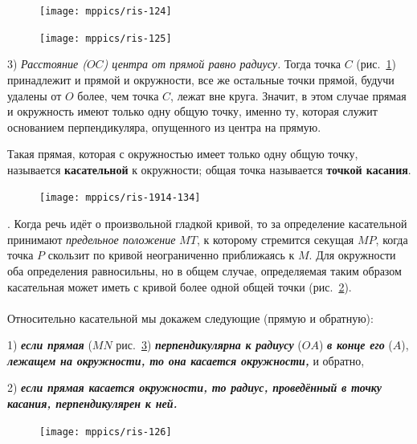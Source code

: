 \documentclass[twoside]{book}
\makeatletter
\newcommand{\rindex}[2][\imki@jobname]{%
  \index[#1]{\detokenize{#2}}%
}
\makeatother
\begin{document}
\begin{figure}
\centering
\texttt{[image: mppics/ris-124]}
\caption{}\label{1938/ris-124}
\bigskip
\texttt{[image: mppics/ris-125]}
\caption{}\label{1938/ris-125}
\end{figure}

3) \emph{Расстояние \emph{($OC$)} центра от прямой равно радиусу.}
Тогда точка $C$ (рис.~\ref{1938/ris-125}) принадлежит и прямой и окружности, все же остальные точки прямой, будучи удалены от $O$ более, чем точка $C$, лежат вне круга.
Значит, в этом случае прямая и окружность имеют только одну общую точку, именно ту, которая служит основанием перпендикуляра, опущенного из центра на прямую.

Такая прямая, которая с окружностью имеет только одну общую точку, называется \rindex{касательная}\textbf{касательной} к окружности;
общая точка называется \rindex{точка касания}\textbf{точкой касания}.


\medskip

\begin{figure}
\centering
\texttt{[image: mppics/ris-1914-134]}
\caption{}\label{1914/ris-134}
\end{figure}

\smallskip
\mbox{.}
Когда речь идёт о произвольной гладкой кривой, то за определение касательной принимают \emph{предельное положение} $MT$, к которому стремится секущая $MP$, когда точка $P$ скользит по кривой неограниченно приближаясь к $M$.
Для окружности оба определения равносильны, но в общем случае, определяемая таким образом касательная может иметь с кривой более одной общей точки (рис.~\ref{1914/ris-134}).%

\paragraph{}\label{1938/113}
Относительно касательной мы докажем следующие  (прямую и обратную):

1) \textbf{\emph{если прямая}} ($MN$ рис.~\ref{1938/ris-126}) \textbf{\emph{перпендикулярна к радиусу}} ($OA$) \textbf{\emph{в конце его}} ($A$), \textbf{\emph{лежащем на окружности, то она касается окружности,}} и обратно,

2) \textbf{\emph{если прямая касается окружности, то радиус, проведённый в точку касания, перпендикулярен к ней.}}

\begin{figure}
\centering
\texttt{[image: mppics/ris-126]}
\caption{}\label{1938/ris-126}
\end{figure}
\end{document}
